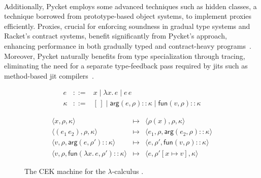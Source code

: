         \paragraph{}%
            Additionally, Pycket employs some advanced techniques such as hidden classes, a technique borrowed from prototype-based object systems, to implement proxies efficiently. Proxies, crucial for enforcing soundness in gradual type systems and Racket’s contract systems, benefit significantly from Pycket’s approach, enhancing performance in both gradually typed and contract-heavy programs~\cite{findler-felleisen:2002,pycketmain2}. Moreover, Pycket naturally benefits from type specialization through tracing, eliminating the need for a separate type-feedback pass required by \glspl{jit} such as method-based \gls{jit} compilers~\cite{typeSpecial:2009}.

        \begin{figure}[t]
        \centering
        \[
        \begin{array}{lcl}
            e &::=& x \mid \lambda x.\,e \mid e\,e \\[4pt]
            \kappa &::=& [\,]
                    \mid \mathsf{arg}(e,\rho)::\kappa
                    \mid \mathsf{fun}(v,\rho)::\kappa
        \end{array}
        \]

        \[
        \begin{array}{rcl}
            \langle x,\rho,\kappa \rangle
            &\longmapsto&
            \langle \rho(x),\rho,\kappa \rangle \\[6pt]

            \langle (e_1\,e_2),\rho,\kappa \rangle
            &\longmapsto&
            \langle e_1,\rho,\mathsf{arg}(e_2,\rho)::\kappa \rangle \\[6pt]

            \langle v,\rho,\mathsf{arg}(e,\rho')::\kappa \rangle
            &\longmapsto&
            \langle e,\rho',\mathsf{fun}(v,\rho)::\kappa \rangle \\[6pt]

            \langle v,\rho,\mathsf{fun}(\lambda x.\,e,\rho')::\kappa \rangle
            &\longmapsto&
            \langle e,\rho'[x \mapsto v],\kappa \rangle
        \end{array}
        \]
        \caption{The CEK machine for the $\lambda$‑calculus \cite{pycketmain}.}
        \label{fig:cek-formal}
        \end{figure}

